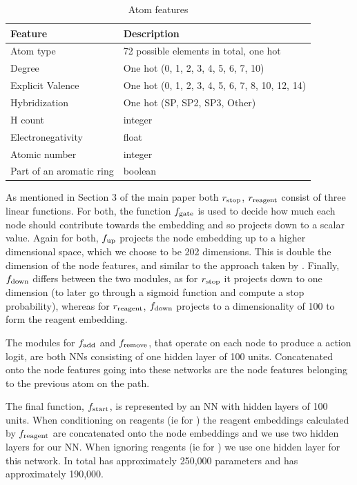 \begin{table}
  \caption{Atom features}
  \label{table:atom-features}
  \centering
  \begin{tabular}{ll}
    \toprule
    Feature     & Description      \\
    \midrule
    Atom type & 72 possible elements in total, one hot  \\
    Degree     & One hot (0,   1,   2,   3,   4,   5,   6,   7,  10)  \\
    Explicit Valence     & One hot   (0,   1,   2,   3,   4,   5,   6,   7,   8,  10,  12,  14)    \\
    Hybridization & One hot (SP, SP2, SP3, Other) \\
    H count & integer \\
    Electronegativity & float \\
    Atomic number & integer \\
    Part of an aromatic ring & boolean\\
    \bottomrule
  \end{tabular}
\end{table}

As mentioned in Section 3 of the main paper both $r_{\textrm{stop}}$, $r_\mathrm{reagent}$ consist of three
linear functions. 
For  both, the function $f_\textrm{gate}$ is used to decide how much each node should contribute towards the embedding and so projects down to a scalar value.
Again for both, $f_\textrm{up}$ projects the node embedding up to a higher dimensional space, which we choose to be 202 dimensions. 
This is double the dimension of the node features, and similar to the approach taken by \citet[\S B.1]{li2018learning}.
Finally, $f_\textrm{down}$ differs between the two modules, as for $r_{\textrm{stop}}$ it projects down to one dimension (to later go through a sigmoid function and compute a stop probability), whereas for  $r_\mathrm{reagent}$, $f_\textrm{down}$ projects  to a dimensionality of 100 to form the reagent embedding.


The modules for $f_{\textrm{add}}$ and $f_{\textrm{remove}}$, that operate on each node to produce a action logit, are both NNs consisting of one hidden layer of 100 units. 
Concatenated onto the node features going into these networks are the node features belonging to the previous atom on the path.



The final function, $f_{\textrm{start}}$, is represented by an NN with hidden layers of 100 units. 
When conditioning on reagents (ie for
 \ourModelR
 )
  the reagent embeddings calculated by $f_{\textrm{reagent}}$ are concatenated onto the node embeddings and we use two hidden layers for our NN. When ignoring reagents (ie for \ourModelIR) we use one hidden layer for this network. In total \ourModelR has approximately 250,000 parameters and \ourModelIR has approximately 190,000.


